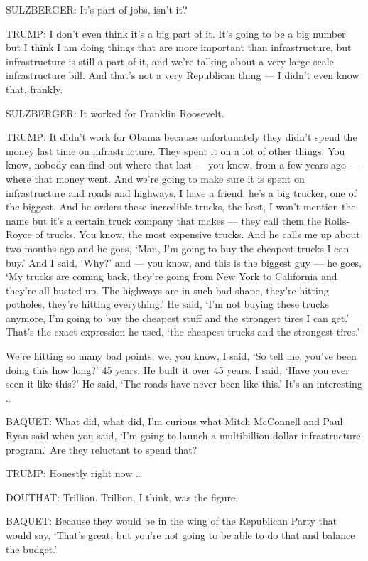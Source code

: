 SULZBERGER: It's part of jobs, isn't it?

TRUMP: I don't even think it's a big part of it. It's going to be a big
number but I think I am doing things that are more important than
infrastructure, but infrastructure is still a part of it, and we're
talking about a very large-scale infrastructure bill. And that's not a
very Republican thing --- I didn't even know that, frankly.

SULZBERGER: It worked for Franklin Roosevelt.

TRUMP: It didn't work for Obama because unfortunately they didn't spend
the money last time on infrastructure. They spent it on a lot of other
things. You know, nobody can find out where that last --- you know, from
a few years ago --- where that money went. And we're going to make sure
it is spent on infrastructure and roads and highways. I have a friend,
he's a big trucker, one of the biggest. And he orders these incredible
trucks, the best, I won't mention the name but it's a certain truck
company that makes --- they call them the Rolls-Royce of trucks. You
know, the most expensive trucks. And he calls me up about two months ago
and he goes, `Man, I'm going to buy the cheapest trucks I can buy.' And
I said, `Why?' and --- you know, and this is the biggest guy --- he
goes, `My trucks are coming back, they're going from New York to
California and they're all busted up. The highways are in such bad
shape, they're hitting potholes, they're hitting everything.' He said,
`I'm not buying these trucks anymore, I'm going to buy the cheapest
stuff and the strongest tires I can get.' That's the exact expression he
used, `the cheapest trucks and the strongest tires.'

We're hitting so many bad points, we, you know, I said, `So tell me,
you've been doing this how long?' 45 years. He built it over 45 years. I
said, `Have you ever seen it like this?' He said, `The roads have never
been like this.' It's an interesting \ldots{}

BAQUET: What did, what did, I'm curious what Mitch McConnell and Paul
Ryan said when you said, `I'm going to launch a multibillion-dollar
infrastructure program.' Are they reluctant to spend that?

TRUMP: Honestly right now \ldots{}

DOUTHAT: Trillion. Trillion, I think, was the figure.

BAQUET: Because they would be in the wing of the Republican Party that
would say, `That's great, but you're not going to be able to do that and
balance the budget.'

